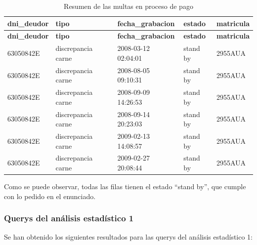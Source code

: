 \documentclass[]{article}
\begin{document}
\begin{table}[H]
\begin{longtable}{lllll}
    \hline
    \textbf{dni\_deudor} & \textbf{tipo} & \textbf{fecha\_grabacion} & \textbf{estado} & \textbf{matricula} \\ \hline
    \endfirsthead
    
    \hline
    \textbf{dni\_deudor} & \textbf{tipo} & \textbf{fecha\_grabacion} & \textbf{estado} & \textbf{matricula} \\ \hline
    \endhead
    
    63050842E & discrepancia carne & 2008-03-12 02:04:01 & stand by & 2955AUA \\ \hline
    63050842E & discrepancia carne & 2008-08-05 09:10:31 & stand by & 2955AUA \\ \hline
    63050842E & discrepancia carne & 2008-09-09 14:26:53 & stand by & 2955AUA \\ \hline
    63050842E & discrepancia carne & 2008-09-14 20:23:03 & stand by & 2955AUA \\ \hline
    63050842E & discrepancia carne & 2009-02-13 14:08:57 & stand by & 2955AUA \\ \hline
    63050842E & discrepancia carne & 2009-02-27 20:08:44 & stand by & 2955AUA \\ \hline
    
\end{longtable}
\caption{Resumen de las multas en proceso de pago}
\end{table}

Como se puede observar, todas las filas tienen el estado ``stand by'', que cumple con lo pedido en el enunciado.

\subsubsection{Querys del análisis estadístico 1}
Se han obtenido los siguientes resultados para las querys del análisis estadístico 1:
\end{document}
